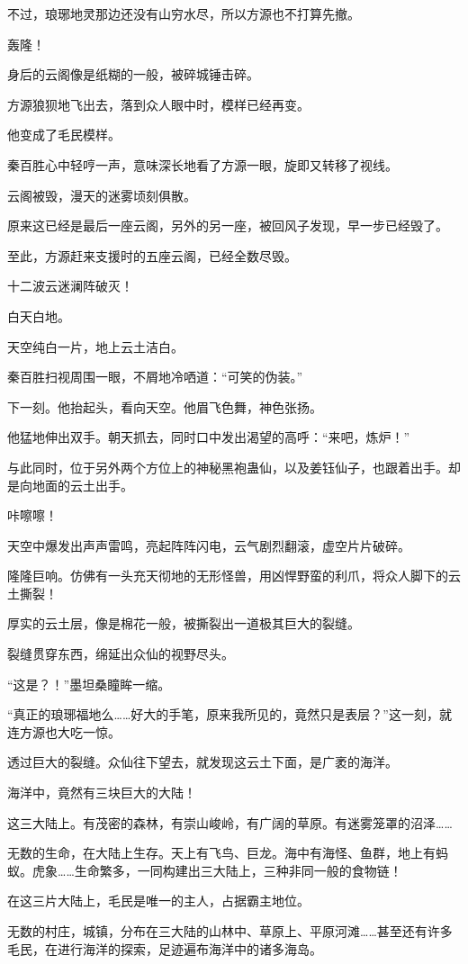 \begin{this_body}
不过，琅琊地灵那边还没有山穷水尽，所以方源也不打算先撤。

轰隆！

身后的云阁像是纸糊的一般，被碎城锤击碎。

方源狼狈地飞出去，落到众人眼中时，模样已经再变。

他变成了毛民模样。

秦百胜心中轻哼一声，意味深长地看了方源一眼，旋即又转移了视线。

云阁被毁，漫天的迷雾顷刻俱散。

原来这已经是最后一座云阁，另外的另一座，被回风子发现，早一步已经毁了。

至此，方源赶来支援时的五座云阁，已经全数尽毁。

十二波云迷澜阵破灭！

白天白地。

天空纯白一片，地上云土洁白。

秦百胜扫视周围一眼，不屑地冷哂道：“可笑的伪装。”

下一刻。他抬起头，看向天空。他眉飞色舞，神色张扬。

他猛地伸出双手。朝天抓去，同时口中发出渴望的高呼：“来吧，炼炉！”

与此同时，位于另外两个方位上的神秘黑袍蛊仙，以及姜钰仙子，也跟着出手。却是向地面的云土出手。

咔嚓嚓！

天空中爆发出声声雷鸣，亮起阵阵闪电，云气剧烈翻滚，虚空片片破碎。

隆隆巨响。仿佛有一头充天彻地的无形怪兽，用凶悍野蛮的利爪，将众人脚下的云土撕裂！

厚实的云土层，像是棉花一般，被撕裂出一道极其巨大的裂缝。

裂缝贯穿东西，绵延出众仙的视野尽头。

“这是？！”墨坦桑瞳眸一缩。

“真正的琅琊福地么……好大的手笔，原来我所见的，竟然只是表层？”这一刻，就连方源也大吃一惊。

透过巨大的裂缝。众仙往下望去，就发现这云土下面，是广袤的海洋。

海洋中，竟然有三块巨大的大陆！

这三大陆上。有茂密的森林，有崇山峻岭，有广阔的草原。有迷雾笼罩的沼泽……

无数的生命，在大陆上生存。天上有飞鸟、巨龙。海中有海怪、鱼群，地上有蚂蚁。虎象……生命繁多，一同构建出三大陆上，三种非同一般的食物链！

在这三片大陆上，毛民是唯一的主人，占据霸主地位。

无数的村庄，城镇，分布在三大陆的山林中、草原上、平原河滩……甚至还有许多毛民，在进行海洋的探索，足迹遍布海洋中的诸多海岛。


\end{this_body}
